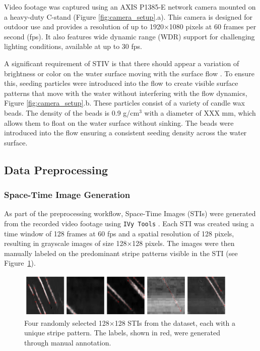 \documentclass[12pt]{elsarticle}
\begin{document}
Video footage was captured using an AXIS P1385-E network camera mounted on a heavy-duty C-stand (Figure \ref{fig:camera_setup}.a). This camera is designed for outdoor use and provides a resolution of up to 1920×1080 pixels at 60 frames per second (fps). It also features wide dynamic range (WDR) support for challenging lighting conditions, available at up to 30 fps.

A significant requirement of STIV is that there should appear a variation of brightness or color on the water surface moving with the surface flow \cite{fujita2007development}. To ensure this, seeding particles were introduced into the flow to create visible surface patterns that move with the water without interfering with the flow dynamics, Figure \ref{fig:camera_setup}.b. These particles consist of a variety of candle wax beads. The density of the beads is 0.9 g/cm$^3$ with a diameter of XXX mm, which allows them to float on the water surface without sinking. The beads were introduced into the flow ensuring a consistent seeding density across the water surface.
\subsection{Data Preprocessing}
\subsubsection{Space-Time Image Generation}
As part of the preprocessing workflow, Space-Time Images (STIs) were generated from the recorded video footage using \texttt{IVy Tools} \cite{engel2025ivytools}. Each STI was created using a time window of 128 frames at 60 fps and a spatial resolution of 128 pixels, resulting in grayscale images of size 128×128 pixels. The images were then manually labeled on the predominant stripe patterns visible in the STI (see Figure~\ref{fig:sti_demo}).

\begin{figure}[!htbp]
    \centering
    \includegraphics[width=0.95\textwidth,trim=0in 0in 4in 0in,clip]{plots/STI_random.png}
    \caption{Four randomly selected 128$\times$128 STIs from the dataset, each with a unique stripe pattern. The labels, shown in red, were generated through manual annotation.}
    \label{fig:sti_demo}
\end{figure}
\end{document}
